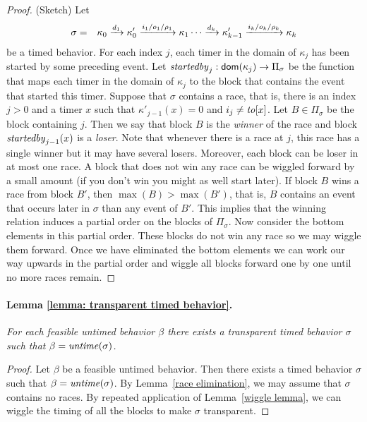 \begin{proof}
(Sketch) Let
\begin{eqnarray*}
\sigma & = & \kappa_0 \xrightarrow{d_1} \kappa'_0 \xrightarrow{i_1/o_1/\rho_1} \kappa_1 \cdots
\xrightarrow{d_k} \kappa'_{k-1} \xrightarrow{i_k/o_k/\rho_k} \kappa_{k}
\end{eqnarray*}
be a timed behavior.
%
For each index $j$, each timer in the domain of $\kappa_j$ has been started by some preceding event.
Let $\mathit{startedby}_j : {\textsf{dom}}(\kappa_j) \rightarrow \Pi_\sigma$ be the function that maps each timer in
the domain of $\kappa_j$ to the block that contains the event that started this timer.
Suppose that $\sigma$ contains a race, that is, there is an index $j>0$ and a timer $x$  
such that $\kappa'_{j-1}(x) = 0$ and $i_j \neq \mathit{to}[x]$.
Let $B \in \Pi_\sigma$ be the block containing $j$. Then we say that block $B$ is the \emph{winner} of the race and block
$\mathit{startedby}_{j-1}(x)$ is a \emph{loser}.
Note that whenever there is a race at $j$, this race has a single winner but it may have several losers.
Moreover, each block can be loser in at most one race.
A block that does not win any race can be wiggled forward by a small amount (if you don't win you might as well start later).
If block $B$ wins a race from block $B'$, then $\max(B)>\max(B')$, that is, $B$ contains an event that occurs later
in $\sigma$ than any event of $B'$.
This implies that the winning relation induces a partial order on the blocks of $\Pi_\sigma$.
Now consider the bottom elements in this partial order. These blocks do not win any race so we may wiggle them forward.
Once we have eliminated the bottom elements we can work our way upwards in the partial order and wiggle all blocks
forward one by one until no more races remain.
\end{proof}

\paragraph{Lemma \ref{lemma: transparent timed behavior}.}
\emph{For each feasible untimed behavior $\beta$ there exists
a transparent timed behavior $\sigma$ such that $\beta = \mathit{untime}(\sigma)$.}

\begin{proof}
Let $\beta$ be a feasible untimed behavior.
Then there exists a timed behavior $\sigma$ such that $\beta = \mathit{untime}(\sigma)$.
By Lemma~\ref{race elimination}, we may assume that $\sigma$ contains no races.
By repeated application of Lemma~\ref{wiggle lemma}, we can wiggle the timing of all the blocks to make $\sigma$ transparent.
\end{proof}

